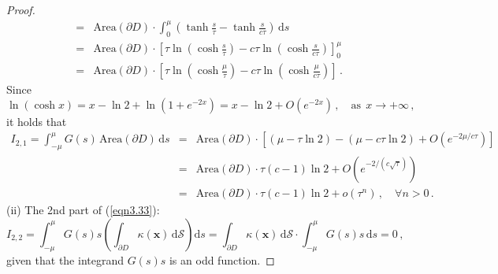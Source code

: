 \documentclass[final,hidelinks,onefignum,onetabnum]{siamart251216}
\begin{document}
\begin{proof}
\begin{eqnarray}
&=& \mathrm{Area}(\partial D)\cdot \int_0^{\mu}\left( \tanh \frac{s}{\tau} - \tanh \frac{s}{c\tau} \right) \,\mathrm{d}s  \nonumber \\
 &= & \mathrm{Area}(\partial D)\cdot\left[ \tau \ln\left(\cosh \frac{s}{\tau}\right) - c\tau \ln\left(\cosh \frac{s}{c\tau}\right) \right]_0^\mu \nonumber \\
 &= & \mathrm{Area}(\partial D)\cdot\left[ \tau \ln\left(\cosh \frac{\mu}{\tau}\right) - c\tau \ln\left(\cosh \frac{\mu}{c\tau}\right) \right]\,.
\end{eqnarray}
Since
\begin{equation}
\ln\left(\cosh x \right)= x-\ln2+\ln\left(1+e^{-2x}\right)=x-\ln2+O\left(e^{-2x}\right)\,,\quad\mathrm{as}\ \ x\to+\infty\,,
\end{equation}
it holds that
\begin{eqnarray}
I_{2,1}=\int_{-\mu}^{\mu} G(s) \,\mathrm{Area}(\partial D)\, \mathrm{d}s &=& \mathrm{Area}(\partial D)\cdot \left[ (\mu - \tau \ln 2) - (\mu - c\tau \ln 2) + O\left(e^{-2\mu/c\tau}\right) \right] \nonumber \\
&=& \mathrm{Area}(\partial D)\cdot \tau(c-1) \ln 2 + O\left(e^{-2/(c\sqrt{\tau})}\right) \nonumber \\
&=& \mathrm{Area}(\partial D)\cdot \tau(c-1) \ln 2 + o(\tau^n)\,,\quad \forall n>0\,. \label{eqn3.36}
\end{eqnarray}
(ii) The 2nd part of (\ref{eqn3.33}):
\begin{equation} \label{eqn3.37}
I_{2,2}=\int_{-\mu}^{\mu} G(s) s \left( \int_{\partial D} \kappa(\mathbf{x})\, \mathrm{d}\mathcal{S} \right) \mathrm{d}s = \int_{\partial D} \kappa(\mathbf{x})\, \mathrm{d}\mathcal{S}\cdot \int_{-\mu}^{\mu} G(s) s \, \mathrm{d}s =0\,,
\end{equation}
given that the integrand $G(s) s$ is an odd function.


\end{proof}
\end{document}
